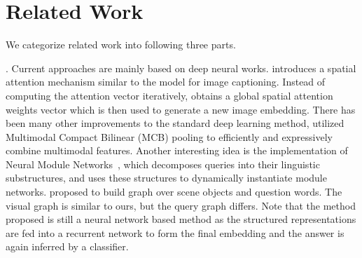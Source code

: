 \section{Related Work}
\label{sec-related-work}
\hspace{-2ex}
We categorize related work into following three parts. %


. Current \vqa approaches are mainly based on deep neural works.  \cite{zhu2016visual7w} introduces a spatial attention mechanism similar to the model for image captioning. %
Instead of computing the attention vector iteratively, \cite{xu2016ask} obtains a global spatial attention weights vector which is then used to generate a new image embedding. 
There has been many other improvements to the standard deep learning method, \eg %
\cite{fukui2016multimodal} utilized Multimodal Compact Bilinear (MCB) pooling to efficiently and expressively combine multimodal features. Another interesting idea is the implementation of Neural Module Networks~\cite{Andreas_2016,hu2017learning}, which decomposes queries into their linguistic substructures, and uses these structures to dynamically instantiate module networks. %
\cite{teney2017graph} proposed to build graph over scene objects and question words. The visual graph is similar to ours, but the query graph differs. %
Note that the method \cite{teney2017graph} proposed is still a neural network based method as the structured representations are fed into a recurrent network to form the final embedding and the answer is again inferred by a classifier. %


